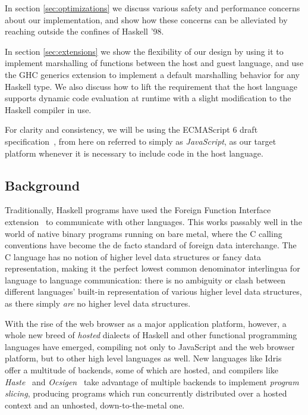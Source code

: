 \documentclass{sigplanconf}
\begin{document}
In section \ref{sec:optimizations} we discuss various safety and performance
concerns about our implementation, and show how these concerns can be
alleviated by reaching outside the confines of Haskell '98.

In section \ref{sec:extensions} we show the flexibility of our design by using
it to implement marshalling of functions between the host and guest language,
and use the GHC generics extension to implement a default marshalling behavior
for any Haskell type. We also discuss how to lift the requirement that the host
language supports dynamic code evaluation at runtime with a slight
modification to the Haskell compiler in use.

For clarity and consistency, we will be using the ECMAScript 6
draft specification\ \cite{es6}, from here on referred to simply as
\emph{JavaScript}, as our target platform whenever it is necessary to include
code in the host language.

\subsection{Background}\label{sec:background}
Traditionally, Haskell programs have used the Foreign Function Interface
extension\ \cite{ffi} to communicate with other languages. This works
passably well in the world of native binary programs running on bare metal,
where the C calling conventions have become the de facto standard of foreign
data interchange.
The C language has no notion of higher level data structures or
fancy data representation, making it the perfect lowest common denominator
interlingua for language to language communication:
there is no ambiguity or clash between different languages' built-in
representation of various higher level data structures, as there simply
\emph{are} no higher level data structures.

With the rise of the web browser as a major application platform, however,
a whole new breed of \emph{hosted} dialects of Haskell and other functional
programming languages have emerged, compiling not only to JavaScript and the
web browser platform, but to other high level languages as well.
New languages like Idris\ \cite{idris} offer a multitude of backends,
some of which are hosted, and compilers like \emph{Haste}\ \cite{haste} and
\emph{Ocsigen}\ \cite{ocsigen} take advantage of multiple backends to
implement \emph{program slicing}, producing programs which run concurrently
distributed over a hosted context and an unhosted, down-to-the-metal one.
\end{document}
